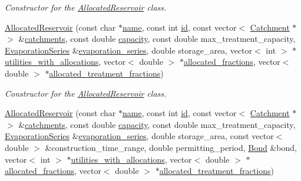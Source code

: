 \begin{DoxyCompactItemize}
\begin{DoxyCompactList}\small\item\em Constructor for the \mbox{\hyperlink{classAllocatedReservoir}{Allocated\+Reservoir}} class. \end{DoxyCompactList}\item 
\mbox{\hyperlink{classAllocatedReservoir_a17a60d40d936b1a68459d0bd9578aada}{Allocated\+Reservoir}} (const char $\ast$\mbox{\hyperlink{classWaterSource_a846ea74c5b453d014f594d41fee8c765}{name}}, const int \mbox{\hyperlink{classWaterSource_a6eafe5dfefd317877d1244e8a7c6e742}{id}}, const vector$<$ \mbox{\hyperlink{classCatchment}{Catchment}} $\ast$$>$ \&\mbox{\hyperlink{classWaterSource_a8c18c34f23f8a06685c1d12f462ed830}{catchments}}, const double \mbox{\hyperlink{classWaterSource_a2ec257b415b248214a8bce7fc5267723}{capacity}}, const double max\+\_\+treatment\+\_\+capacity, \mbox{\hyperlink{classEvaporationSeries}{Evaporation\+Series}} \&\mbox{\hyperlink{classReservoir_a2d2d9b302c13703309bb798d24136810}{evaporation\+\_\+series}}, double storage\+\_\+area, vector$<$ int $>$ $\ast$\mbox{\hyperlink{classWaterSource_ac345583fc2d0f7e1db31ee40244d7ace}{utilities\+\_\+with\+\_\+allocations}}, vector$<$ double $>$ $\ast$\mbox{\hyperlink{classWaterSource_a2f6655a80c4847fe039987255d9d998c}{allocated\+\_\+fractions}}, vector$<$ double $>$ $\ast$\mbox{\hyperlink{classWaterSource_aa73fe10cfc6579b2fb79529e1dde5140}{allocated\+\_\+treatment\+\_\+fractions}})
\begin{DoxyCompactList}\small\item\em Constructor for the \mbox{\hyperlink{classAllocatedReservoir}{Allocated\+Reservoir}} class. \end{DoxyCompactList}\item 
\mbox{\hyperlink{classAllocatedReservoir_a44ac982717a21a0b24bb3019d07ffe89}{Allocated\+Reservoir}} (const char $\ast$\mbox{\hyperlink{classWaterSource_a846ea74c5b453d014f594d41fee8c765}{name}}, const int \mbox{\hyperlink{classWaterSource_a6eafe5dfefd317877d1244e8a7c6e742}{id}}, const vector$<$ \mbox{\hyperlink{classCatchment}{Catchment}} $\ast$$>$ \&\mbox{\hyperlink{classWaterSource_a8c18c34f23f8a06685c1d12f462ed830}{catchments}}, const double \mbox{\hyperlink{classWaterSource_a2ec257b415b248214a8bce7fc5267723}{capacity}}, const double max\+\_\+treatment\+\_\+capacity, \mbox{\hyperlink{classEvaporationSeries}{Evaporation\+Series}} \&\mbox{\hyperlink{classReservoir_a2d2d9b302c13703309bb798d24136810}{evaporation\+\_\+series}}, double storage\+\_\+area, const vector$<$ double $>$ \&construction\+\_\+time\+\_\+range, double permitting\+\_\+period, \mbox{\hyperlink{classBond}{Bond}} \&bond, vector$<$ int $>$ $\ast$\mbox{\hyperlink{classWaterSource_ac345583fc2d0f7e1db31ee40244d7ace}{utilities\+\_\+with\+\_\+allocations}}, vector$<$ double $>$ $\ast$\mbox{\hyperlink{classWaterSource_a2f6655a80c4847fe039987255d9d998c}{allocated\+\_\+fractions}}, vector$<$ double $>$ $\ast$\mbox{\hyperlink{classWaterSource_aa73fe10cfc6579b2fb79529e1dde5140}{allocated\+\_\+treatment\+\_\+fractions}})

\end{DoxyCompactItemize}
